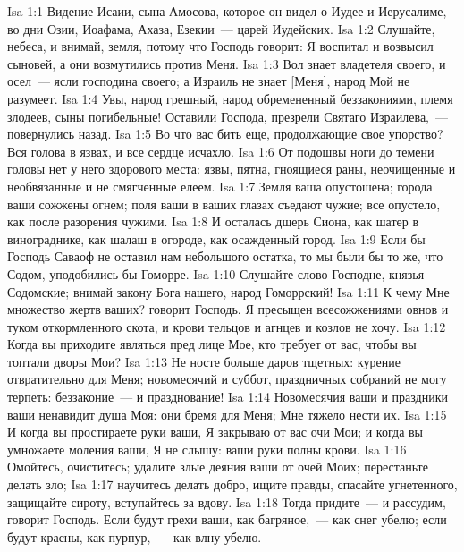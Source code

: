 \vs Isa 1:1 Видение Исаии, сына Амосова, которое он видел о Иудее и Иерусалиме, во дни Озии, Иоафама, Ахаза, Езекии~--- царей Иудейских.
\rsbpar\vs Isa 1:2 Слушайте, небеса, и внимай, земля, потому что Господь говорит: Я воспитал и возвысил сыновей, а они возмутились против Меня.
\vs Isa 1:3 Вол знает владетеля своего, и осел~--- ясли господина своего; а Израиль не знает [Меня], народ Мой не разумеет.
\vs Isa 1:4 Увы, народ грешный, народ обремененный беззакониями, племя злодеев, сыны погибельные! Оставили Господа, презрели Святаго Израилева,~--- повернулись назад.
\vs Isa 1:5 Во что вас бить еще, продолжающие свое упорство? Вся голова в язвах, и все сердце исчахло.
\vs Isa 1:6 От подошвы ноги до темени головы нет у него здорового места: язвы, пятна, гноящиеся раны, неочищенные и необвязанные и не смягченные елеем.
\vs Isa 1:7 Земля ваша опустошена; города ваши сожжены огнем; поля ваши в ваших глазах съедают чужие; все опустело, как после разорения чужими.
\vs Isa 1:8 И осталась дщерь Сиона, как шатер в винограднике, как шалаш в огороде, как осажденный город.
\vs Isa 1:9 Если бы Господь Саваоф не оставил нам небольшого остатка, то мы были бы то же, что Содом, уподобились бы Гоморре.
\rsbpar\vs Isa 1:10 Слушайте слово Господне, князья Содомские; внимай закону Бога нашего, народ Гоморрский!
\vs Isa 1:11 К чему Мне множество жертв ваших? говорит Господь. Я пресыщен всесожжениями овнов и туком откормленного скота, и крови тельцов и агнцев и козлов не хочу.
\vs Isa 1:12 Когда вы приходите являться пред лице Мое, кто требует от вас, чтобы вы топтали дворы Мои?
\vs Isa 1:13 Не носте больше даров тщетных: курение отвратительно для Меня; новомесячий и суббот, праздничных собраний не могу терпеть: беззаконие~--- и празднование!
\vs Isa 1:14 Новомесячия ваши и праздники ваши ненавидит душа Моя: они бремя для Меня; Мне тяжело нести их.
\vs Isa 1:15 И когда вы простираете руки ваши, Я закрываю от вас очи Мои; и когда вы умножаете моления ваши, Я не слышу: ваши руки полны крови.
\rsbpar\vs Isa 1:16 Омойтесь, очиститесь; удалите злые деяния ваши от очей Моих; перестаньте делать зло;
\vs Isa 1:17 научитесь делать добро, ищите правды, спасайте угнетенного, защищайте сироту, вступайтесь за вдову.
\vs Isa 1:18 Тогда придите~--- и рассудим, говорит Господь. Если будут грехи ваши, как багряное,~--- как снег убелю; если будут красны, как пурпур,~--- как влну убелю.
